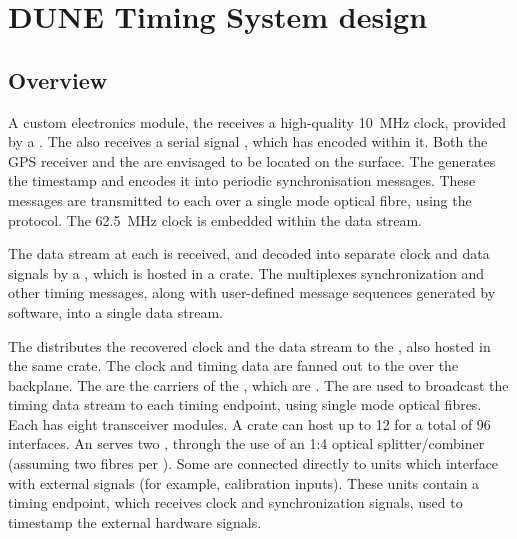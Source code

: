\documentclass{dune}
\begin{document}

\section{DUNE Timing System design}
\label{sec:system_design}
\subsection{Overview}
A custom electronics module, the  receives a high-quality \SI{10}{\MHz} clock, provided by a . The  also receives a serial  signal \cite{irig}, which has  encoded within it. Both the GPS receiver and the  are envisaged to be located on the surface. The  generates the  timestamp and encodes it into periodic synchronisation messages. These messages are transmitted to each  over a single mode optical fibre, using the  protocol. The \SI{62.5}{\MHz} clock is embedded within the data stream.

The data stream at each  is received, and decoded into separate clock and data signals by a , which is hosted in a  crate. The  multiplexes synchronization and other timing messages, along with user-defined message sequences generated by software, into a single data stream. 

The  distributes the recovered clock and the data stream to the , also hosted in the same  crate. The clock and timing data are fanned out to the  over the  backplane. The  are the carriers of the , which are . The  are used to broadcast the timing data stream to each timing endpoint, using single mode optical fibres. Each  has eight  transceiver modules. A  crate can host up to 12  for a total of 96  interfaces. An  serves two , through the use of an 1:4 optical splitter/combiner (assuming two fibres per ). Some  are connected directly to units which interface with external signals (for example, calibration inputs). These  units contain a timing endpoint, which receives clock and synchronization signals, used to timestamp the external hardware signals.
\end{document}
